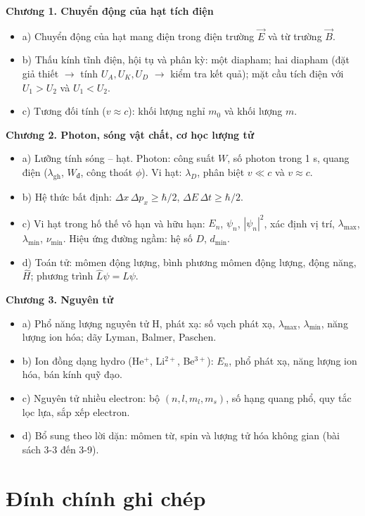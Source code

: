 \documentclass[11pt,a4paper]{article}
\newcommand{\Wd}{W_{\text{đ}}}
\begin{document}
\textbf{Chương 1. Chuyển động của hạt tích điện}
\begin{itemize}
    \item a) Chuyển động của hạt mang điện trong điện trường $\vec E$ và từ trường $\vec B$.
    \item b) Thấu kính tĩnh điện, hội tụ và phân kỳ: một diapham; hai diapham (đặt giả thiết $\to$ tính $U_A, U_K, U_D$ $\to$ kiểm tra kết quả); mặt cầu tích điện với $U_1>U_2$ và $U_1<U_2$.
    \item c) Tương đối tính ($v\approx c$): khối lượng nghỉ $m_0$ và khối lượng $m$.
\end{itemize}
\textbf{Chương 2. Photon, sóng vật chất, cơ học lượng tử}
\begin{itemize}
    \item a) Lưỡng tính sóng -- hạt. Photon: công suất $W$, số photon trong 1 s, quang điện ($\lambda_{\text{gh}}$, $\Wd$, công thoát $\phi$). Vi hạt: $\lambda_D$, phân biệt $v\ll c$ và $v\approx c$.
    \item b) Hệ thức bất định: $\Delta x\,\Delta p_x\ge\hbar/2$, $\Delta E\,\Delta t\ge\hbar/2$.
    \item c) Vi hạt trong hố thế vô hạn và hữu hạn: $E_n$, $\psi_n$, $|\psi_n|^2$, xác định vị trí, $\lambda_{\max}$, $\lambda_{\min}$, $\nu_{\min}$. Hiệu ứng đường ngầm: hệ số $D$, $d_{\min}$.
    \item d) Toán tử: mômen động lượng, bình phương mômen động lượng, động năng, $\hat H$; phương trình $\hat L\psi=L\psi$.
\end{itemize}
\textbf{Chương 3. Nguyên tử}
\begin{itemize}
    \item a) Phổ năng lượng nguyên tử H, phát xạ: số vạch phát xạ, $\lambda_{\max}$, $\lambda_{\min}$, năng lượng ion hóa; dãy Lyman, Balmer, Paschen.
    \item b) Ion đồng dạng hydro (He$^{+}$, Li$^{2+}$, Be$^{3+}$): $E_n$, phổ phát xạ, năng lượng ion hóa, bán kính quỹ đạo.
    \item c) Nguyên tử nhiều electron: bộ $(n,l,m_l,m_s)$, số hạng quang phổ, quy tắc lọc lựa, sắp xếp electron.
    \item d) Bổ sung theo lời dặn: mômen từ, spin và lượng tử hóa không gian (bài sách 3-3 đến 3-9).
\end{itemize}

\section*{Đính chính ghi chép}
\end{document}
